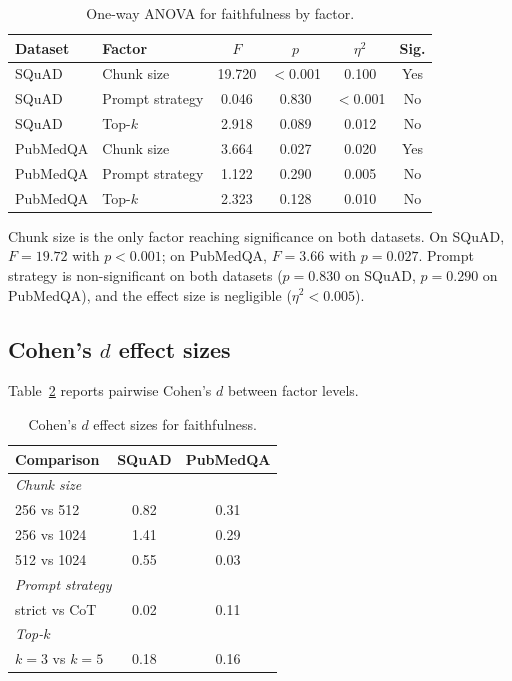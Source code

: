 \begin{table}[!htb]
\centering
\caption{One-way ANOVA for faithfulness by factor.}
\label{tab:anova}
\small
\begin{tabular}{llcccc}
\toprule
Dataset & Factor & $F$ & $p$ & $\eta^2$ & Sig. \\
\midrule
SQuAD    & Chunk size      & 19.720 & $<$0.001 & 0.100 & Yes \\
SQuAD    & Prompt strategy & 0.046  & 0.830    & $<$0.001 & No \\
SQuAD    & Top-$k$         & 2.918  & 0.089    & 0.012 & No \\
\midrule
PubMedQA & Chunk size      & 3.664  & 0.027    & 0.020 & Yes \\
PubMedQA & Prompt strategy & 1.122  & 0.290    & 0.005 & No \\
PubMedQA & Top-$k$         & 2.323  & 0.128    & 0.010 & No \\
\bottomrule
\end{tabular}
\end{table}

Chunk size is the only factor reaching significance on both datasets.
On SQuAD, $F = 19.72$ with $p < 0.001$; on PubMedQA, $F = 3.66$ with
$p = 0.027$. Prompt strategy is non-significant on both datasets
($p = 0.830$ on SQuAD, $p = 0.290$ on PubMedQA), and the effect size
is negligible ($\eta^2 < 0.005$).

\FloatBarrier
\subsection{Cohen's \texorpdfstring{$d$}{d} effect sizes}
\label{app:cohend}

Table~\ref{tab:cohend} reports pairwise Cohen's $d$ between factor levels.

\begin{table}[!htb]
\centering
\caption{Cohen's $d$ effect sizes for faithfulness.}
\label{tab:cohend}
\small
\begin{tabular}{lcc}
\toprule
Comparison & SQuAD & PubMedQA \\
\midrule
\multicolumn{3}{l}{\emph{Chunk size}} \\
256 vs 512  & 0.82 & 0.31 \\
256 vs 1024 & 1.41 & 0.29 \\
512 vs 1024 & 0.55 & 0.03 \\
\midrule
\multicolumn{3}{l}{\emph{Prompt strategy}} \\
strict vs CoT & 0.02 & 0.11 \\
\midrule
\multicolumn{3}{l}{\emph{Top-$k$}} \\
$k = 3$ vs $k = 5$ & 0.18 & 0.16 \\
\bottomrule
\end{tabular}
\end{table}

